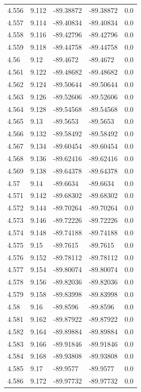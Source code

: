 \begin{tabular}{lllll}
4.556 & 9.112 & -89.38872 & -89.38872 & 0.0 \\
4.557 & 9.114 & -89.40834 & -89.40834 & 0.0 \\
4.558 & 9.116 & -89.42796 & -89.42796 & 0.0 \\
4.559 & 9.118 & -89.44758 & -89.44758 & 0.0 \\
4.56 & 9.12 & -89.4672 & -89.4672 & 0.0 \\
4.561 & 9.122 & -89.48682 & -89.48682 & 0.0 \\
4.562 & 9.124 & -89.50644 & -89.50644 & 0.0 \\
4.563 & 9.126 & -89.52606 & -89.52606 & 0.0 \\
4.564 & 9.128 & -89.54568 & -89.54568 & 0.0 \\
4.565 & 9.13 & -89.5653 & -89.5653 & 0.0 \\
4.566 & 9.132 & -89.58492 & -89.58492 & 0.0 \\
4.567 & 9.134 & -89.60454 & -89.60454 & 0.0 \\
4.568 & 9.136 & -89.62416 & -89.62416 & 0.0 \\
4.569 & 9.138 & -89.64378 & -89.64378 & 0.0 \\
4.57 & 9.14 & -89.6634 & -89.6634 & 0.0 \\
4.571 & 9.142 & -89.68302 & -89.68302 & 0.0 \\
4.572 & 9.144 & -89.70264 & -89.70264 & 0.0 \\
4.573 & 9.146 & -89.72226 & -89.72226 & 0.0 \\
4.574 & 9.148 & -89.74188 & -89.74188 & 0.0 \\
4.575 & 9.15 & -89.7615 & -89.7615 & 0.0 \\
4.576 & 9.152 & -89.78112 & -89.78112 & 0.0 \\
4.577 & 9.154 & -89.80074 & -89.80074 & 0.0 \\
4.578 & 9.156 & -89.82036 & -89.82036 & 0.0 \\
4.579 & 9.158 & -89.83998 & -89.83998 & 0.0 \\
4.58 & 9.16 & -89.8596 & -89.8596 & 0.0 \\
4.581 & 9.162 & -89.87922 & -89.87922 & 0.0 \\
4.582 & 9.164 & -89.89884 & -89.89884 & 0.0 \\
4.583 & 9.166 & -89.91846 & -89.91846 & 0.0 \\
4.584 & 9.168 & -89.93808 & -89.93808 & 0.0 \\
4.585 & 9.17 & -89.9577 & -89.9577 & 0.0 \\
4.586 & 9.172 & -89.97732 & -89.97732 & 0.0 \\

\end{tabular}
